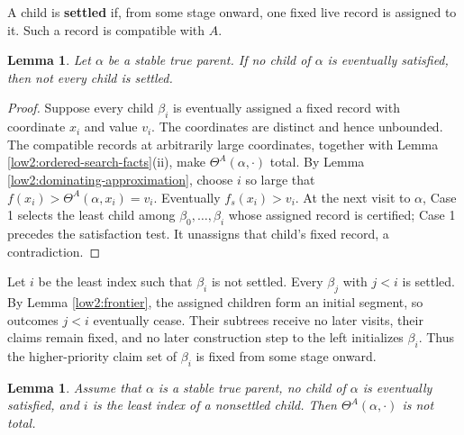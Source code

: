 \documentclass[11pt]{amsart}
\newtheorem{lemma}[theorem]{Lemma}
\begin{document}
A child is \textbf{settled} if, from some stage onward, one fixed live record
is assigned to it. Such a record is compatible with $A$.

\begin{lemma}\label{low2:not-all-settle}
Let $\alpha$ be a stable true parent. If no child of $\alpha$ is eventually
satisfied, then not every child is settled.
\end{lemma}

\begin{proof}
Suppose every child $\beta_i$ is eventually assigned a fixed record with
coordinate $x_i$ and value $v_i$.
The coordinates are distinct and hence unbounded. The compatible records at
arbitrarily large coordinates, together with Lemma
\ref{low2:ordered-search-facts}(ii), make
$\Theta^A(\alpha,\cdot)$ total. By Lemma
\ref{low2:dominating-approximation}, choose $i$ so large that $f(x_i)>\Theta^A(\alpha,x_i)=v_i$.
Eventually $f_s(x_i)>v_i$. At the next visit to $\alpha$, Case 1 selects the
least child among $\beta_0,\ldots,\beta_i$ whose assigned record is certified;
Case 1 precedes the satisfaction test. It unassigns that child's fixed record,
a contradiction.
\end{proof}

Let $i$ be the least index such that $\beta_i$ is not settled. Every
$\beta_j$ with $j<i$ is settled. By Lemma \ref{low2:frontier}, the assigned
children form an initial segment, so outcomes $j<i$ eventually cease. Their
subtrees receive no later
visits, their claims remain fixed, and no later construction step to the left
initializes $\beta_i$. Thus the higher-priority claim set of $\beta_i$ is
fixed from some stage onward.

\begin{lemma}\label{low2:auxiliary-partial}
Assume that $\alpha$ is a stable true parent, no child of $\alpha$ is
eventually satisfied, and $i$ is the least index of a nonsettled child. Then
$\Theta^A(\alpha,\cdot)$ is not total.
\end{lemma}
\end{document}
